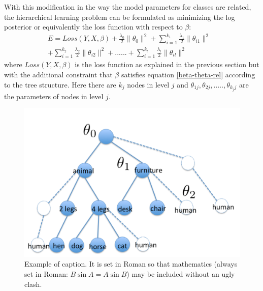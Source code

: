 \documentclass[10pt,twocolumn,letterpaper]{article}
\begin{document}
With this modification in the way the model parameters for classes are related,  the hierarchical 
learning problem can be formulated as minimizing the log posterior or equivalently the loss function 
with respect to $\beta$:
\begin{equation} \label{hier-loss}
\begin{split}
E = Loss(Y,X,\beta) + \frac{\lambda_{0}}{2} \|\theta_{0} \|^{2} +
\sum_{i=1}^{k_{1}} \frac{\lambda_{1}}{2} \|\theta_{i1} \|^{2} & \\
+ \sum_{i=1}^{k_{2}} \frac{\lambda_{2}}{2} \|\theta_{i2} \|^{2} +
...... +
\sum_{i=1}^{k_{l}} \frac{\lambda_{l}}{2} \|\theta_{il} \|^{2} &
\end{split}
\end{equation} 
 where $Loss(Y,X,\beta)$ is the loss function as explained in the previous section
 but with the additional constraint that $\beta$ satisfies  equation \ref{beta-theta-rel} 
 according to the tree structure. Here there are $k_{j}$ nodes in level $j$ and 
 $\theta_{1j}, \theta_{2j},.....,\theta_{k_{j}j}$ are the parameters of nodes in level $j$.
\begin{figure}[t]
	\begin{center}
		\includegraphics[width=0.8\linewidth]{tree}
	\end{center}
	\caption{Example of caption.  It is set in Roman so that mathematics
		(always set in Roman: $B \sin A = A \sin B$) may be included without an
		ugly clash.}
	\label{fig:long}
	\label{fig:onecol}
\end{figure}
\end{document}
